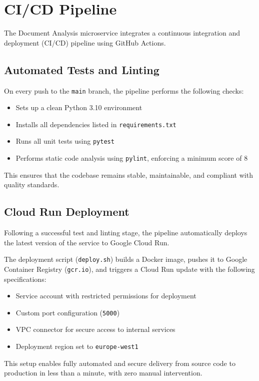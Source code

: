 \section{CI/CD Pipeline}

The Document Analysis microservice integrates a continuous integration and deployment (CI/CD) pipeline using GitHub Actions.

\subsection{Automated Tests and Linting}

On every push to the \texttt{main} branch, the pipeline performs the following checks:
\begin{itemize}
    \item Sets up a clean Python 3.10 environment
    \item Installs all dependencies listed in \texttt{requirements.txt}
    \item Runs all unit tests using \texttt{pytest}
    \item Performs static code analysis using \texttt{pylint}, enforcing a minimum score of 8
\end{itemize}

This ensures that the codebase remains stable, maintainable, and compliant with quality standards.

\subsection{Cloud Run Deployment}

Following a successful test and linting stage, the pipeline automatically deploys the latest version of the service to Google Cloud Run.

The deployment script (\texttt{deploy.sh}) builds a Docker image, pushes it to Google Container Registry (\texttt{gcr.io}), and triggers a Cloud Run update with the following specifications:
\begin{itemize}
    \item Service account with restricted permissions for deployment
    \item Custom port configuration (\texttt{5000})
    \item VPC connector for secure access to internal services
    \item Deployment region set to \texttt{europe-west1}
\end{itemize}

This setup enables fully automated and secure delivery from source code to production in less than a minute, with zero manual intervention.

